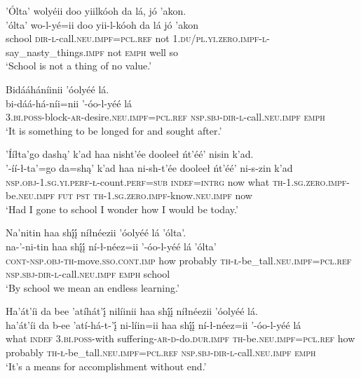 \ea\label{ex:text3-9-3}
’Ólta’ wolyéii doo yiilkóoh da lá, jó ’akon.\\
\gll ’ólta’	wo-l-yé=ii	doo	yii-l-kóoh	da	lá	jó	’akon\\
     school	\textsc{dir}-\textsc{l}-call.\textsc{neu}.\textsc{impf}=\textsc{pcl}.\textsc{ref}	not	1.\textsc{du}/\textsc{pl}.\textsc{yi}.\textsc{zero}.\textsc{impf}-\textsc{l}-say\_nasty\_things.\textsc{impf}	not	\textsc{emph}	well	so\\
\glt `School is not a thing of no value.'
\z

\ea\label{ex:text3-9-4}
Bidááháníinii ’óolyéé lá.\\
\gll bi-dáá-há-níi=nii	’-óo-l-yéé	lá\\
     3.\textsc{bi}.\textsc{poss}-block-\textsc{ar}-desire.\textsc{neu}.\textsc{impf}=\textsc{pcl}.\textsc{ref}	\textsc{nsp}.\textsc{sbj}-\textsc{dir}-\textsc{l}-call.\textsc{neu}.\textsc{impf}	\textsc{emph}\\
\glt `It is something to be longed for and sought after.'
\z

\ea\label{ex:text3-9-5}
’Ííłta’go dashą’ k’ad haa nisht’ée dooleeł ńt’éé’ nisin k’ad.\\
\gll ’-íí-ł-ta’=go	da=shą’	k’ad	haa	ni-sh-t’ée	dooleeł	ńt’éé’	ni-s-zin	k’ad\\
     \textsc{nsp}.\textsc{obj}-1.\textsc{sg}.\textsc{yi}.\textsc{perf}-\textsc{ł}-count.\textsc{perf}=\textsc{sub}		\textsc{indef}=\textsc{intrg}	now	what	\textsc{th}-1.\textsc{sg}.\textsc{zero}.\textsc{impf}-be.\textsc{neu}.\textsc{impf}	\textsc{fut}	\textsc{pst}	\textsc{th}-1.\textsc{sg}.\textsc{zero}.\textsc{impf}-know.\textsc{neu}.\textsc{impf}	now\\
\glt `Had I gone to school I wonder how I would be today.'
\z

\ea\label{ex:text3-9-6}
Na’nitin haa shį́į́ níłnéezii ’óolyéé lá ’ólta’.\\
\gll na-’-ni-tin	haa shį́į́	ní-ł-néez=ii	’-óo-l-yéé	lá	’ólta’\\
     \textsc{cont}-\textsc{nsp}.\textsc{obj}-\textsc{th}-move.\textsc{sso}.\textsc{cont}.\textsc{imp}	how probably	\textsc{th}-\textsc{ł}-be\_tall.\textsc{neu}.\textsc{impf}=\textsc{pcl}.\textsc{ref}	\textsc{nsp}.\textsc{sbj}-\textsc{dir}-\textsc{l}-call.\textsc{neu}.\textsc{impf}	\textsc{emph}	school\\
\glt `By school we mean an endless learning.'
\z

\ea\label{ex:text3-9-7}
Ha’át’íi da bee ’atíhát’į́ nilíinii haa shį́į́ níłnéezii ’óolyéé lá.\\
\gll ha’át’íi	da	b-ee	’atí-há-t-’į́	ni-líin=ii	haa shį́į́	ní-ł-néez=ii	’-óo-l-yéé	lá\\
     what	\textsc{indef}	3.\textsc{bi}.\textsc{poss}-with	suffering-\textsc{ar}-\textsc{d}-do.\textsc{dur}.\textsc{impf}	\textsc{th}-be.\textsc{neu}.\textsc{impf}=\textsc{pcl}.\textsc{ref}	how probably	\textsc{th}-\textsc{ł}-be\_tall.\textsc{neu}.\textsc{impf}=\textsc{pcl}.\textsc{ref}	\textsc{nsp}.\textsc{sbj}-\textsc{dir}-\textsc{l}-call.\textsc{neu}.\textsc{impf}	\textsc{emph}\\
\glt `It's a means for accomplishment without end.'
\z

